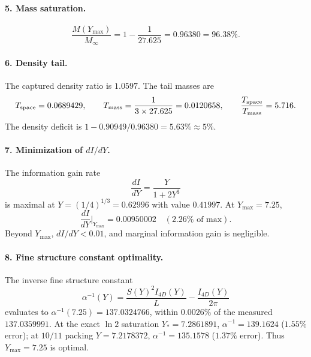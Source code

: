 \documentclass[12pt,oneside,openany]{book}
\begin{document}
\paragraph{5. Mass saturation.}
\begin{equation}
\frac{M(Y_{\max})}{M_\infty} = 1 - \frac{1}{27.625} = 0.96380 = 96.38\%.
\end{equation}

\paragraph{6. Density tail.} The captured density ratio is \(1.0597\). The tail masses are
\begin{equation}
T_{\rm space} = 0.0689429, \qquad T_{\rm mass} = \frac{1}{3 \times 27.625} = 0.0120658, \qquad \frac{T_{\rm space}}{T_{\rm mass}} = 5.716.
\end{equation}
The density deficit is \(1 - 0.90949/0.96380 = 5.63\% \approx 5\%\).

\paragraph{7. Minimization of \(dI/dY\).} The information gain rate
\begin{equation}
\frac{dI}{dY} = \frac{Y}{1+2Y^3}
\end{equation}
is maximal at \(Y = (1/4)^{1/3} = 0.62996\) with value \(0.41997\). At \(Y_{\max} = 7.25\),
\begin{equation}
\frac{dI}{dY}\bigg|_{Y_{\max}} = 0.00950002 \quad (2.26\%\text{ of max}).
\end{equation}
Beyond \(Y_{\max}\), \(dI/dY < 0.01\), and marginal information gain is negligible.

\paragraph{8. Fine structure constant optimality.} The inverse fine structure constant
\begin{equation}
\alpha^{-1}(Y) = \frac{S(Y)^2 I_{4D}(Y)}{L} - \frac{I_{4D}(Y)}{2\pi}
\end{equation}
evaluates to \(\alpha^{-1}(7.25) = 137.0324766\), within \(0.0026\%\) of the measured \(137.0359991\). At the exact \(\ln 2\) saturation \(Y_* = 7.2861891\), \(\alpha^{-1} = 139.1624\) (\(1.55\%\) error); at \(10/11\) packing \(Y = 7.2178372\), \(\alpha^{-1} = 135.1578\) (\(1.37\%\) error). Thus \(Y_{\max} = 7.25\) is optimal.
\end{document}
